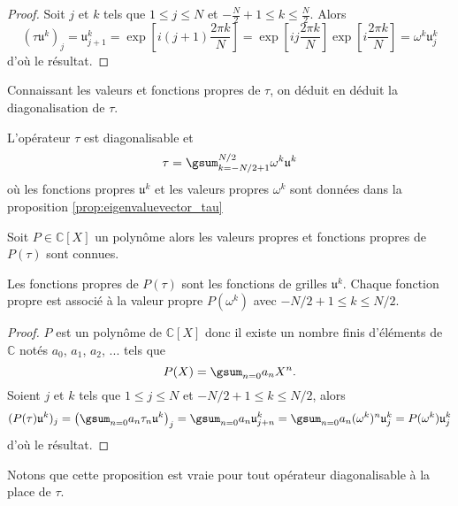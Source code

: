 \begin{proof}
Soit $j$ et $k$ tels que $1 \leq j \leq N$ et $-\frac{N}{2}+1 \leq k \leq \frac{N}{2}$. Alors
\begin{equation}
(\tau \mathfrak{u}^k)_j = \mathfrak{u}^k_{j+1}  = \exp \left[ i (j+1) \dfrac{2 \pi k}{N} \right] = \exp \left[ i j \dfrac{2 \pi k}{N} \right] \exp \left[ i \dfrac{2 \pi k}{N} \right]  = \omega^k \mathfrak{u}_j^k
\end{equation}
d'où le résultat.
\end{proof}
Connaissant les valeurs et fonctions propres de $\tau$, on déduit en déduit la diagonalisation de $\tau$.

\begin{corollaire}
L'opérateur $\tau$ est diagonalisable et 
\begin{equation}
\tau = \gsum_{k = -N/2+1}^{N/2} \omega^k \mathfrak{u}^k
\end{equation}
où les fonctions propres $\mathfrak{u}^k$ et les valeurs propres $\omega^k$ sont données dans la proposition \ref{prop:eigenvaluevector_tau}
\end{corollaire}
Soit $P \in \mathbb{C}[X]$ un polynôme alors les valeurs propres et fonctions propres de $P(\tau)$ sont connues.

\begin{proposition}
Les fonctions propres de $P(\tau)$ sont les fonctions de grilles $\mathfrak{u}^k$.
Chaque fonction propre est associé à la valeur propre $P(\omega^k)$ avec $-N/2+1 \leq k \leq N/2$.
\label{prop:eigen_tau}
\end{proposition}

\begin{proof}
$P$ est un polynôme de $\mathbb{C}[X]$ donc il existe un nombre finis d'éléments de $\mathbb{C}$ notés $a_0$, $a_1$, $a_2$, ... tels que
\begin{equation}
P(X) = \gsum_{n=0} a_n X^n.
\end{equation}
Soient $j$ et $k$ tels que $1 \leq j \leq N$ et $-N/2+1 \leq k \leq N/2$, alors 
\begin{equation}
(P(\tau) \mathfrak{u}^k)_j = \left( \gsum_{n=0} a_n \tau_n \mathfrak{u}^k \right)_j = \gsum_{n=0} a_n \mathfrak{u}^k_{j+n}  = \gsum_{n=0} a_n (\omega^k)^n \mathfrak{u}^k_j = P(\omega^k) \mathfrak{u}^k_j
\end{equation}
d'où le résultat.
\end{proof}

Notons que cette proposition est vraie pour tout opérateur diagonalisable à la place de $\tau$.

